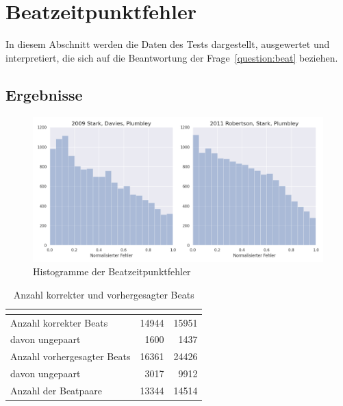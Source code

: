 \section{Beatzeitpunktfehler}
{
	\label{ergebnisse/beatzeitpunktfehler}

	In diesem Abschnitt werden die Daten des Tests dargestellt, ausgewertet und interpretiert,
		die sich auf die Beantwortung der Frage~\ref{question:beat} beziehen.

	\subsection{Ergebnisse}
	{
		\begin{figure}[h]
			\centering
			\includegraphics[scale=0.47]{resources/beat_positions.png}
			\caption{Histogramme der Beatzeitpunktfehler}
			\label{fig:beaterror}
		\end{figure}

		\begin{table}[h]
			\centering
			\begin{tabular}{l | r | r}
				                            & \cite{2009_DaPlSt} & \cite{2011_PlRoSt} \\
				\hline \hline
				Anzahl korrekter Beats      & \num{14944}        & \num{15951}        \\
				davon ungepaart             &  \num{1600}        &  \num{1437}        \\
				\hline
				Anzahl vorhergesagter Beats & \num{16361}        & \num{24426}        \\
				davon ungepaart             &  \num{3017}        &  \num{9912}        \\
				\hline
				Anzahl der Beatpaare        & \num{13344}        & \num{14514}
			\end{tabular}
			\caption{Anzahl korrekter und vorhergesagter Beats}
			\label{tab:pairnum}
		\end{table}

}}
